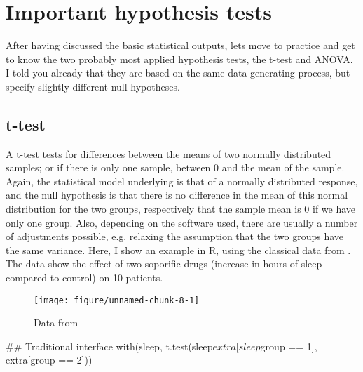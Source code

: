 \documentclass[a4paper,twoside]{tufte-book}\usepackage[]{graphicx}\usepackage[]{color}
\makeatletter
\def\maxwidth{ %
	\ifdim\Gin@nat@width>\linewidth
	\linewidth
	\else
	\Gin@nat@width
	\fi
}
\makeatother
\begin{document}
\section{Important hypothesis tests}

After having discussed the basic statistical outputs, lets move to practice and get to know the two probably most applied hypothesis tests, the t-test and ANOVA. I told you already that they are based on the same data-generating process, but specify slightly different null-hypotheses. 

\subsection{t-test}

A t-test tests for differences between the means of two normally distributed samples; or if there is only one sample, between 0 and the mean of the sample. Again, the statistical model underlying is that of a normally distributed response, and the null hypothesis is that there is no difference in the mean of this normal distribution for the two groups, respectively that the sample mean is 0 if we have only one group. Also, depending on the software used, there are usually a number of adjustments possible, e.g. relaxing the assumption that the two groups have the same variance. Here, I show an example in R, using the classical data from \citet{Student-probableerrormean-1908}. The data show the effect of two soporific drugs (increase in hours of sleep compared to control) on 10 patients. 

\begin{figure}[htbp]
\begin{center}
\begin{Schunk}

\texttt{[image: figure/unnamed-chunk-8-1]} \end{Schunk}
\caption{Data from \citet{Student-probableerrormean-1908}}
\label{fig: Student Sleep Data}
\end{center}
\end{figure}

\begin{Schunk}
\begin{Sinput}
## Traditional interface
with(sleep, t.test(sleep$extra[sleep$group == 1], extra[group == 2]))
\end{Sinput}
\end{Schunk}
\end{document}
